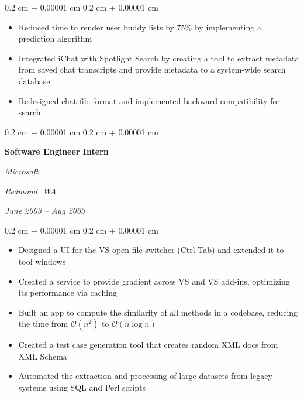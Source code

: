 \documentclass[10pt, letterpaper]{article}
\newenvironment{highlights}{
    \begin{itemize}[
        topsep=0.10 cm,
        parsep=0.10 cm,
        partopsep=0pt,
        itemsep=0pt,
        leftmargin=0.4 cm + 10pt
    ]
}{
    \end{itemize}
} %
\newenvironment{onecolentry}{
    \begin{adjustwidth}{
        0.2 cm + 0.00001 cm
    }{
        0.2 cm + 0.00001 cm
    }
}{
    \end{adjustwidth}
} %
\newenvironment{twocolentry}[2][]{
    \onecolentry
    \def\secondColumn{#2}
    \setcolumnwidth{\fill, 10.5 cm}
    \begin{paracol}{2}
}{
    \switchcolumn \raggedleft \secondColumn
    \end{paracol}
    \endonecolentry
} %
\begin{document}
        \vspace{0.10 cm}
        \begin{onecolentry}
            \begin{highlights}
                \item Reduced time to render user buddy lists by 75\% by implementing a prediction algorithm
                \item Integrated iChat with Spotlight Search by creating a tool to extract metadata from saved chat transcripts and provide metadata to a system-wide search database
                \item Redesigned chat file format and implemented backward compatibility for search
            \end{highlights}
        \end{onecolentry}


        \vspace{0.2 cm}

        \begin{twocolentry}{
        \textit{Redmond, WA}    
            
        \textit{June 2003 – Aug 2003}}
            \textbf{Software Engineer Intern}
            
            \textit{Microsoft}
        \end{twocolentry}

        \vspace{0.10 cm}
        \begin{onecolentry}
            \begin{highlights}
                \item Designed a UI for the VS open file switcher (Ctrl-Tab) and extended it to tool windows
                \item Created a service to provide gradient across VS and VS add-ins, optimizing its performance via caching
                \item Built an app to compute the similarity of all methods in a codebase, reducing the time from $\mathcal{O}(n^2)$ to $\mathcal{O}(n \log n)$
                \item Created a test case generation tool that creates random XML docs from XML Schema
                \item Automated the extraction and processing of large datasets from legacy systems using SQL and Perl scripts
            \end{highlights}
        \end{onecolentry}
\end{document}

